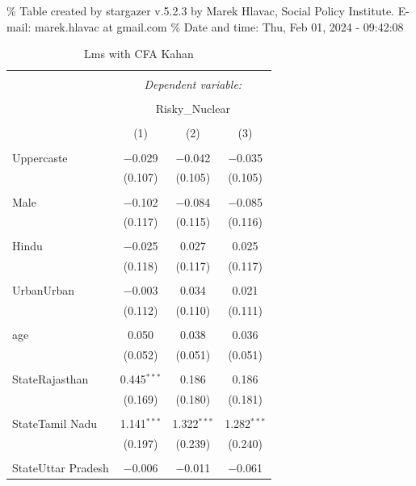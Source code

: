 \documentclass[
]{article}
\begin{document}
\begingroup\setlength{\tabcolsep}{1pt}

\renewcommand{\arraystretch}{0.7}

\% Table created by stargazer v.5.2.3 by Marek Hlavac, Social Policy
Institute. E-mail: marek.hlavac at gmail.com \% Date and time: Thu, Feb
01, 2024 - 09:42:08

\begin{table}[!htbp] \centering 
  \caption{Lms with CFA Kahan} 
  \label{} 
\begin{tabular}{@{\extracolsep{5pt}}lccc} 
\\[-1.8ex]\hline 
\hline \\[-1.8ex] 
 & \multicolumn{3}{c}{\textit{Dependent variable:}} \\ 
\cline{2-4} 
\\[-1.8ex] & \multicolumn{3}{c}{Risky\_Nuclear} \\ 
\\[-1.8ex] & (1) & (2) & (3)\\ 
\hline \\[-1.8ex] 
 Uppercaste & $-$0.029 & $-$0.042 & $-$0.035 \\ 
  & (0.107) & (0.105) & (0.105) \\ 
  & & & \\ 
 Male & $-$0.102 & $-$0.084 & $-$0.085 \\ 
  & (0.117) & (0.115) & (0.116) \\ 
  & & & \\ 
 Hindu & $-$0.025 & 0.027 & 0.025 \\ 
  & (0.118) & (0.117) & (0.117) \\ 
  & & & \\ 
 UrbanUrban & $-$0.003 & 0.034 & 0.021 \\ 
  & (0.112) & (0.110) & (0.111) \\ 
  & & & \\ 
 age & 0.050 & 0.038 & 0.036 \\ 
  & (0.052) & (0.051) & (0.051) \\ 
  & & & \\ 
 StateRajasthan & 0.445$^{***}$ & 0.186 & 0.186 \\ 
  & (0.169) & (0.180) & (0.181) \\ 
  & & & \\ 
 StateTamil Nadu & 1.141$^{***}$ & 1.322$^{***}$ & 1.282$^{***}$ \\ 
  & (0.197) & (0.239) & (0.240) \\ 
  & & & \\ 
 StateUttar Pradesh & $-$0.006 & $-$0.011 & $-$0.061 \\ 

\end{tabular}
\end{table}
\end{document}
